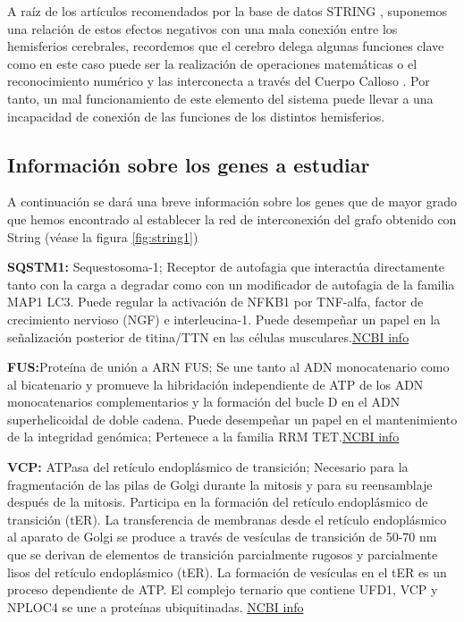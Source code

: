 \hfill

A raíz de los artículos recomendados por la base de datos STRING \cite{Walterfang2014,frontotemporal}, suponemos una relación de estos efectos negativos con una mala conexión entre los hemisferios cerebrales, recordemos que el cerebro delega algunas funciones clave como en este caso puede ser la realización de operaciones matemáticas o el reconocimiento numérico y las interconecta a través del Cuerpo Calloso \cite{CorpusCallosum}. Por tanto, un mal funcionamiento de este elemento del sistema puede llevar a una incapacidad de conexión de las funciones de los distintos hemisferios.

\hfill

\subsection{Información sobre los genes a estudiar}


A continuación se dará una breve información sobre los genes que de mayor grado que hemos encontrado al establecer la red de interconexión del grafo obtenido con String (véase la figura \ref{fig:string1})

\hfill

\textbf{SQSTM1:} Sequestosoma-1; Receptor de autofagia que interactúa directamente tanto con la carga a degradar como con un modificador de autofagia de la familia MAP1 LC3. Puede regular la activación de NFKB1 por TNF-alfa, factor de crecimiento nervioso (NGF) e interleucina-1. Puede desempeñar un papel en la señalización posterior de titina/TTN en las células musculares.\href{https://www.ncbi.nlm.nih.gov/nuccore/NM_001142298.1}{NCBI info}

\hfill

\textbf{FUS:}Proteína de unión a ARN FUS; Se une tanto al ADN monocatenario como al bicatenario y promueve la hibridación independiente de ATP de los ADN monocatenarios complementarios y la formación del bucle D en el ADN superhelicoidal de doble cadena. Puede desempeñar un papel en el mantenimiento de la integridad genómica; Pertenece a la familia RRM TET.\href{https://www.ncbi.nlm.nih.gov/nuccore/NM_001170634.1}{NCBI info}

\hfill

\textbf{VCP:} ATPasa del retículo endoplásmico de transición; Necesario para la fragmentación de las pilas de Golgi durante la mitosis y para su reensamblaje después de la mitosis. Participa en la formación del retículo endoplásmico de transición (tER). La transferencia de membranas desde el retículo endoplásmico al aparato de Golgi se produce a través de vesículas de transición de 50-70 nm que se derivan de elementos de transición parcialmente rugosos y parcialmente lisos del retículo endoplásmico (tER). La formación de vesículas en el tER es un proceso dependiente de ATP. El complejo ternario que contiene UFD1, VCP y NPLOC4 se une a proteínas ubiquitinadas. \href{https://www.ncbi.nlm.nih.gov/nuccore/NM_007126.3}{NCBI info}

